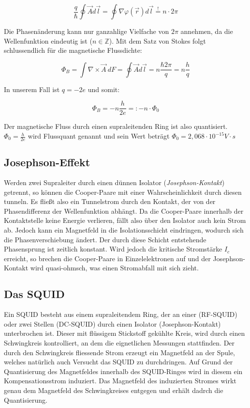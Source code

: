 $$\frac{q}{\hbar}\oint \vec A d\vec l = \oint \nabla \varphi(\vec r) d\vec l \stackrel{!}{=} n\cdot2\pi$$

Die Phasenänderung kann nur ganzahlige Vielfache von $2\pi$ annehmen, da die Wellenfunktion eindeutig ist ($n \in \mathbb Z$). Mit dem Satz von Stokes folgt schlussendlich für die magnetische Flussdichte:

$$ \Phi_B = \int \nabla \times \vec A \ dF = \oint \vec A d\vec l = n\frac{\hbar 2\pi}{q} = n\frac{h}{q} $$

In unserem Fall ist $q=-2e$ und somit:

$$\Phi_B = -n\frac{h}{2e} =: -n\cdot \Phi_0$$

Der magnetische Fluss durch einen supraleitenden Ring ist also quantisiert. $\Phi_0 = \frac{h}{2e}$ wird Flussquant genannt und sein Wert beträgt $\Phi_0 = 2,068 \cdot 10^{-15} V\cdot s$

\subsection{Josephson-Effekt}

Werden zwei Supraleiter durch einen dünnen Isolator (\emph{Josephson-Kontakt}) getrennt, so können die Cooper-Paare mit einer Wahrscheinlichkeit durch diesen tunneln. Es fließt also ein Tunnelstrom durch den Kontakt, der von der Phasendifferenz der Wellenfunktion abhängt. Da die Cooper-Paare innerhalb der Kontaktstelle keine Energie verlieren,  fällt also über den Isolator auch kein Strom ab. Jedoch kann ein Magnetfeld in die Isolationsschicht eindringen, wodurch sich die Phasenverschiebung ändert. Der durch diese Schicht entstehende Phasensprung ist zeitlich konstant. Wird jedoch die kritische Stromstärke $I_c$ erreicht, so brechen die Cooper-Paare in Einzelelektronen auf und der Josephson-Kontakt wird quasi-ohmsch, was einen Stromabfall mit sich zieht.

\subsection{Das SQUID}

Ein SQUID besteht aus einem supraleitendem Ring, der an einer (RF-SQUID) oder zwei Stellen (DC-SQUID) durch einen Isolator (Josephson-Kontakt) unterbrochen ist. Dieser mit flüssigem Stickstoff gekühlte Kreis, wird durch einen Schwingkreis kontrolliert, an dem die eignetlichen Messungen stattfinden. Der durch den Schwingkreis fliessende Strom erzeugt ein Magnetfeld an der Spule, welches natürlich auch Versucht das SQUID zu durchdringen. Auf Grund der Quantisierung des Magnetfeldes innerhalb des SQUID-Ringes wird in diesem ein Kompensationsstrom induziert. Das Magnetfeld des induzierten Stromes wirkt genau dem Magnetfeld des Schwingkreises entgegen und erhält dadrch die Quantisierung.

